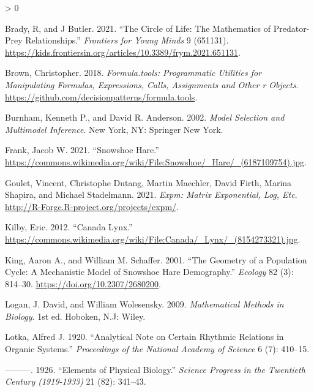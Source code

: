 \documentclass[
]{krantz}
\newlength{\cslhangindent}
\newenvironment{CSLReferences}[2] %
 {%
  \setlength{\parindent}{0pt}
  \ifodd #1 \everypar{\setlength{\hangindent}{\cslhangindent}}\ignorespaces\fi
  \ifnum #2 > 0
  \setlength{\parskip}{#2\baselineskip}
  \fi
 }%
 {}
\theoremstyle{definition}
\theoremstyle{definition}
\theoremstyle{definition}
\theoremstyle{definition}
\theoremstyle{remark}
\begin{document}
\hypertarget{refs}{}
\begin{CSLReferences}{1}{0}
\leavevmode\hypertarget{ref-brady_circle_2021}{}%
Brady, R, and J Butler. 2021. {``The {Circle} of {Life}: {The Mathematics} of {Predator-Prey Relationships}.''} \emph{Frontiers for Young Minds} 9 (651131). \url{https://kids.frontiersin.org/articles/10.3389/frym.2021.651131}.

\leavevmode\hypertarget{ref-R-formula.tools}{}%
Brown, Christopher. 2018. \emph{Formula.tools: Programmatic Utilities for Manipulating Formulas, Expressions, Calls, Assignments and Other r Objects}. \url{https://github.com/decisionpatterns/formula.tools}.

\leavevmode\hypertarget{ref-burnham_model_2002}{}%
Burnham, Kenneth P., and David R. Anderson. 2002. \emph{Model {Selection} and {Multimodel Inference}}. {New York, NY}: {Springer New York}.

\leavevmode\hypertarget{ref-preserve_snowshoe_2011}{}%
Frank, Jacob W. 2021. {``Snowshoe {Hare}.''} \url{https://commons.wikimedia.org/wiki/File:Snowshoe/_Hare/_(6187109754).jpg}.

\leavevmode\hypertarget{ref-R-expm}{}%
Goulet, Vincent, Christophe Dutang, Martin Maechler, David Firth, Marina Shapira, and Michael Stadelmann. 2021. \emph{Expm: Matrix Exponential, Log, Etc}. \url{http://R-Forge.R-project.org/projects/expm/}.

\leavevmode\hypertarget{ref-usa_canada_2012}{}%
Kilby, Eric. 2012. {``Canada {Lynx}.''} \url{https://commons.wikimedia.org/wiki/File:Canada/_Lynx/_(8154273321).jpg}.

\leavevmode\hypertarget{ref-king_geometry_2001}{}%
King, Aaron A., and William M. Schaffer. 2001. {``The {Geometry} of a {Population Cycle}: {A Mechanistic Model} of {Snowshoe Hare Demography}.''} \emph{Ecology} 82 (3): 814--30. \url{https://doi.org/10.2307/2680200}.

\leavevmode\hypertarget{ref-logan_mathematical_2009}{}%
Logan, J. David, and William Wolesensky. 2009. \emph{Mathematical {Methods} in {Biology}}. 1st ed. {Hoboken, N.J}: {W}iley.

\leavevmode\hypertarget{ref-lotka_analytical_1920}{}%
Lotka, Alfred J. 1920. {``Analytical {Note} on {Certain Rhythmic Relations} in {Organic Systems}.''} \emph{Proceedings of the National Academy of Science} 6 (7): 410--15.

\leavevmode\hypertarget{ref-lotka_elements_1926}{}%
---------. 1926. {``Elements of {Physical Biology}.''} \emph{Science Progress in the Twentieth Century (1919-1933)} 21 (82): 341--43.


\end{CSLReferences}
\end{document}
